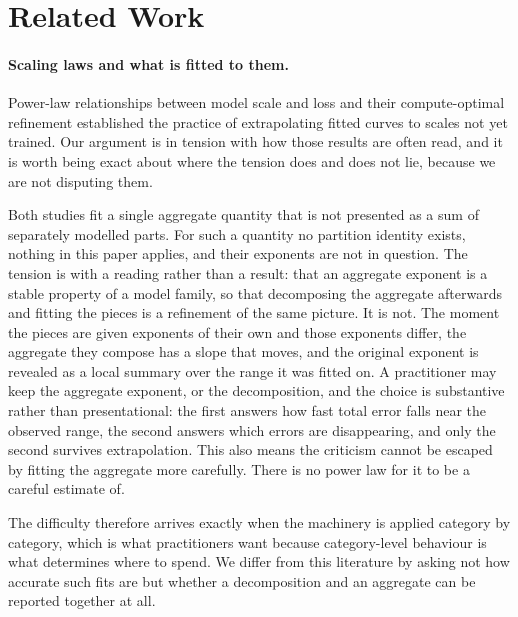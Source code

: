 \documentclass[11pt]{article}
\begin{document}
\section{Related Work}
\label{sec:related}

\paragraph{Scaling laws and what is fitted to them.}
Power-law relationships between model scale and loss \citep{kaplan2020scaling} and
their compute-optimal refinement \citep{hoffmann2022training} established the
practice of extrapolating fitted curves to scales not yet trained. Our argument is
in tension with how those results are often read, and it is worth being exact about
where the tension does and does not lie, because we are not disputing them.

Both studies fit a single aggregate quantity that is not presented as a sum of
separately modelled parts. For such a quantity no partition identity exists, nothing
in this paper applies, and their exponents are not in question. The tension is with
a reading rather than a result: that an aggregate exponent is a stable property of a
model family, so that decomposing the aggregate afterwards and fitting the pieces is
a refinement of the same picture. It is not. The moment the pieces are given
exponents of their own and those exponents differ, the aggregate they compose has a
slope that moves, and the original exponent is revealed as a local summary over the
range it was fitted on. A practitioner may keep the aggregate exponent, or the
decomposition, and the choice is substantive rather than presentational: the first
answers how fast total error falls near the observed range, the second answers which
errors are disappearing, and only the second survives extrapolation. This also means
the criticism cannot be escaped by fitting the aggregate more carefully. There is no
power law for it to be a careful estimate of.

The difficulty therefore arrives exactly when the machinery is applied category by
category, which is what practitioners want because category-level behaviour is what
determines where to spend. We differ from this literature by asking not how accurate
such fits are but whether a decomposition and an aggregate can be reported together
at all.
\end{document}

